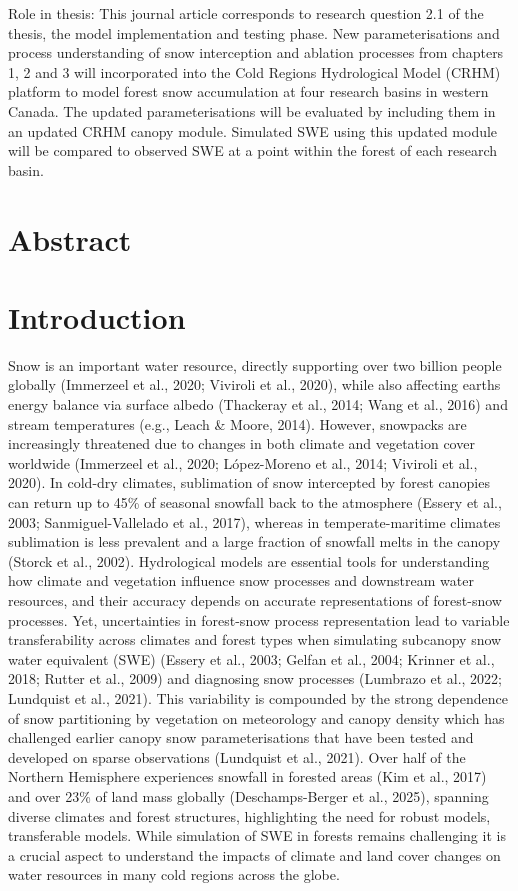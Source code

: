 \documentclass[
  letterpaper,
]{tex/uofsthesis-cs}
\begin{document}
Role in thesis: This journal article corresponds to research question
2.1 of the thesis, the model implementation and testing phase. New
parameterisations and process understanding of snow interception and
ablation processes from chapters 1, 2 and 3 will incorporated into the
Cold Regions Hydrological Model (CRHM) platform to model forest snow
accumulation at four research basins in western Canada. The updated
parameterisations will be evaluated by including them in an updated CRHM
canopy module. Simulated SWE using this updated module will be compared
to observed SWE at a point within the forest of each research basin.

\section{Abstract}\label{abstract-3}

\section{Introduction}\label{introduction-4}

Snow is an important water resource, directly supporting over two
billion people globally (Immerzeel et al., 2020; Viviroli et al., 2020),
while also affecting earths energy balance via surface albedo (Thackeray
et al., 2014; Wang et al., 2016) and stream temperatures (e.g., Leach \&
Moore, 2014). However, snowpacks are increasingly threatened due to
changes in both climate and vegetation cover worldwide (Immerzeel et
al., 2020; López-Moreno et al., 2014; Viviroli et al., 2020). In
cold-dry climates, sublimation of snow intercepted by forest canopies
can return up to 45\% of seasonal snowfall back to the atmosphere
(Essery et al., 2003; Sanmiguel-Vallelado et al., 2017), whereas in
temperate-maritime climates sublimation is less prevalent and a large
fraction of snowfall melts in the canopy (Storck et al., 2002).
Hydrological models are essential tools for understanding how climate
and vegetation influence snow processes and downstream water resources,
and their accuracy depends on accurate representations of forest-snow
processes. Yet, uncertainties in forest-snow process representation lead
to variable transferability across climates and forest types when
simulating subcanopy snow water equivalent (SWE) (Essery et al., 2003;
Gelfan et al., 2004; Krinner et al., 2018; Rutter et al., 2009) and
diagnosing snow processes (Lumbrazo et al., 2022; Lundquist et al.,
2021). This variability is compounded by the strong dependence of snow
partitioning by vegetation on meteorology and canopy density which has
challenged earlier canopy snow parameterisations that have been tested
and developed on sparse observations (Lundquist et al., 2021). Over half
of the Northern Hemisphere experiences snowfall in forested areas (Kim
et al., 2017) and over 23\% of land mass globally (Deschamps-Berger et
al., 2025), spanning diverse climates and forest structures,
highlighting the need for robust models, transferable models. While
simulation of SWE in forests remains challenging it is a crucial aspect
to understand the impacts of climate and land cover changes on water
resources in many cold regions across the globe.
\end{document}
